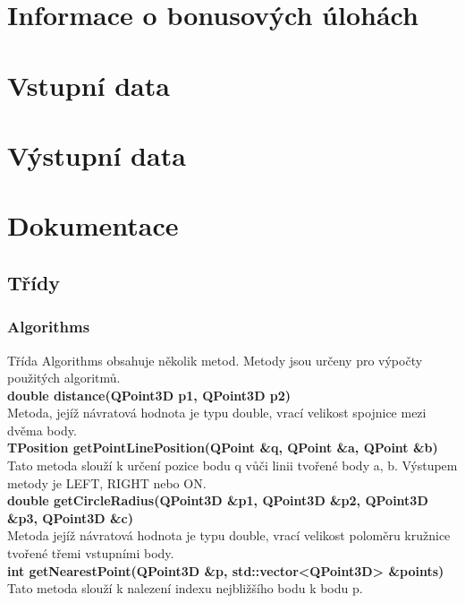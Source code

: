 \documentclass[a4paper, 12pt]{article}
\begin{document}
\section{Informace o bonusových úlohách}


\section{Vstupní data}


\section{Výstupní data}



\clearpage

\section{Dokumentace}
\subsection{Třídy}
\subsubsection{Algorithms}
Třída Algorithms obsahuje několik metod. Metody jsou určeny pro výpočty použitých algoritmů.
\\

\textbf{double distance(QPoint3D p1, QPoint3D p2)}\\
Metoda, jejíž návratová hodnota je typu double, vrací velikost spojnice mezi dvěma body.
\\

\textbf{TPosition getPointLinePosition(QPoint \&q, QPoint \&a, QPoint \&b)}\\
Tato metoda slouží k určení pozice bodu q vůči linii tvořené body a, b. Výstupem metody je LEFT, RIGHT nebo ON.\\

\textbf{double getCircleRadius(QPoint3D \&p1, QPoint3D \&p2, QPoint3D \&p3, QPoint3D \&c)}\\
Metoda jejíž návratová hodnota je typu double, vrací velikost poloměru kružnice tvořené třemi vstupními body.\\

\textbf{int getNearestPoint(QPoint3D \&p, std::vector<QPoint3D> \&points)}\\
Tato metoda slouží k nalezení indexu nejbližšího bodu k bodu p.\\
\end{document}
